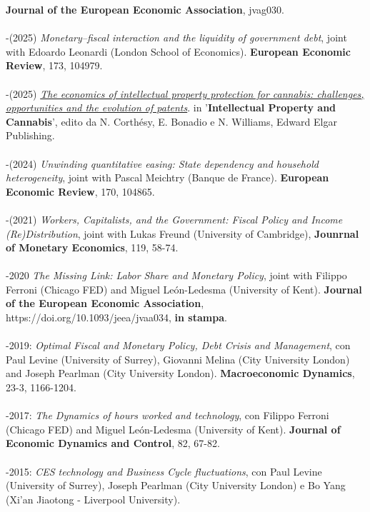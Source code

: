 \documentclass[10p]{article}
\begin{document}
\textbf{Journal of the European Economic Association}, jvag030.\\
\\
-(2025) \emph{Monetary–fiscal interaction and the liquidity of government debt}, joint with Edoardo Leonardi (London School of Economics).
\textbf{European Economic Review}, 173, 104979.\\
\\
-(2025) \emph{\href{https://www.elgaronline.com/edcollchap/book/9781035329397/chapter13.xml}{The economics of intellectual property protection for cannabis: challenges, opportunities and the evolution of patents}}. in '\textbf{Intellectual Property and Cannabis}', edito da N. Corthésy, E. Bonadio e N. Williams, Edward Elgar Publishing.\\
\\
-(2024) \emph{Unwinding quantitative easing: State dependency and household heterogeneity}, joint with Pascal Meichtry (Banque de France).
\textbf{European Economic Review}, 170, 104865.\\
\\
-(2021) \emph{Workers, Capitalists, and the Government: Fiscal Policy and Income (Re)Distribution}, joint with Lukas Freund (University of Cambridge), \textbf{Jounrnal of Monetary Economics}, 119, 58-74.\\
\\
-2020 \emph{The Missing Link: Labor Share and Monetary Policy}, joint with Filippo Ferroni (Chicago FED) and Miguel Le\'{o}n-Ledesma (University of Kent).
\textbf{Journal of the European Economic Association}, \\ https://doi.org/10.1093/jeea/jvaa034, \textbf{in stampa}.\\
\\
-2019: \emph{Optimal Fiscal and Monetary Policy, Debt Crisis and
Management}, con  Paul Levine (University of Surrey), Giovanni Melina (City University London) and Joseph Pearlman (City University London). \textbf{Macroeconomic Dynamics}, 23-3, 1166-1204. \\
\\
-2017: \emph{The Dynamics of hours worked and technology}, con Filippo Ferroni (Chicago FED) and Miguel Le\'{o}n-Ledesma (University of Kent).
\textbf{Journal of Economic Dynamics and Control}, 82, 67-82.\\
\\
-2015: \emph{CES technology and Business Cycle fluctuations}, con Paul Levine (University of Surrey), Joseph Pearlman (City University London) e Bo Yang (Xi'an Jiaotong - Liverpool University).
\end{document}
